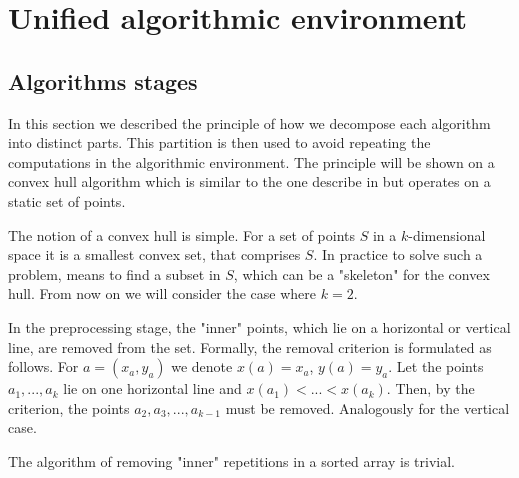 \documentclass[conference]{IEEEtran}
\begin{document}
\section{Unified algorithmic environment}
\label{sec:unified-algorithmic-environment}

\subsection{Algorithms stages}


	In this section we described the principle of how we decompose each algorithm into distinct parts. This partition is then used to avoid repeating the computations in the algorithmic environment. The principle will be shown on a convex hull algorithm which is similar to the one describe in \cite{overmars} but operates on a static set of points.
	
	The notion of a convex hull is simple. For a set of points $S$ in a $k$-dimensional space it is a smallest convex set, that comprises $S$. In practice to solve such a problem, means to find a subset in $S$, which can be a "skeleton" for the convex hull.
	From now on we will consider the case where $k=2$.


	In the preprocessing stage, the "inner" points, which lie on a horizontal or vertical line, are removed from the set. Formally, the removal criterion is formulated as follows. For $a = (x_a, y_a)$ we denote $x(a)=x_a$, $y(a)=y_a$. Let the points $a_1, ..., a_k$ lie on one horizontal line and $x(a_1) < ... < x (a_k) $. Then, by the criterion, the points $a_2, a_3, ..., a_{k-1}$ must be removed. Analogously for the vertical case.
	
	The algorithm of removing "inner" repetitions in a sorted array is trivial.
	
\end{document}
